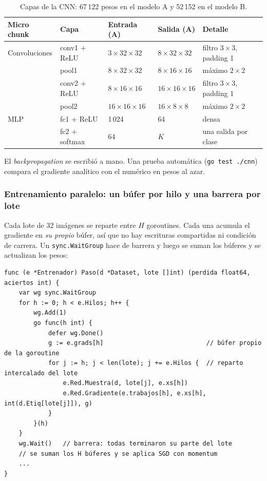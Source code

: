 \documentclass[10pt,a4paper]{article}
\begin{document}
\begin{table}[H]
\centering
\small
\begin{tabular}{lllll}
\toprule
\textbf{Micro chunk} & \textbf{Capa} & \textbf{Entrada (A)} & \textbf{Salida (A)} & \textbf{Detalle} \\
\midrule
Convoluciones & conv1 + ReLU & $3 \times 32 \times 32$ & $8 \times 32 \times 32$ & filtro $3 \times 3$, padding 1 \\
 & pool1 & $8 \times 32 \times 32$ & $8 \times 16 \times 16$ & máximo $2 \times 2$ \\
 & conv2 + ReLU & $8 \times 16 \times 16$ & $16 \times 16 \times 16$ & filtro $3 \times 3$, padding 1 \\
 & pool2 & $16 \times 16 \times 16$ & $16 \times 8 \times 8$ & máximo $2 \times 2$ \\
MLP & fc1 + ReLU & 1\,024 & 64 & densa \\
 & fc2 + softmax & 64 & $K$ & una salida por clase \\
\bottomrule
\end{tabular}
\caption{Capas de la CNN: 67\,122 pesos en el modelo A y 52\,152 en el modelo B.}
\label{tab:cnn}
\end{table}

El \textit{backpropagation} se escribió a mano. Una prueba automática (\texttt{go test ./cnn}) compara
el gradiente analítico con el numérico en pesos al azar.

\subsubsection{Entrenamiento paralelo: un búfer por hilo y una barrera por lote}

Cada lote de 32 imágenes se reparte entre $H$ goroutines. Cada una acumula el gradiente en \emph{su
propio} búfer, así que no hay escrituras compartidas ni condición de carrera. Un
\texttt{sync.WaitGroup} hace de barrera y luego se suman los búferes y se actualizan los pesos:

\begin{lstlisting}[language={}]
func (e *Entrenador) Paso(d *Dataset, lote []int) (perdida float64, aciertos int) {
    var wg sync.WaitGroup
    for h := 0; h < e.Hilos; h++ {
        wg.Add(1)
        go func(h int) {
            defer wg.Done()
            g := e.grads[h]                            // búfer propio de la goroutine
            for j := h; j < len(lote); j += e.Hilos {  // reparto intercalado del lote
                e.Red.Muestra(d, lote[j], e.xs[h])
                e.Red.Gradiente(e.trabajos[h], e.xs[h], int(d.Etiq[lote[j]]), g)
            }
        }(h)
    }
    wg.Wait()   // barrera: todas terminaron su parte del lote
    // se suman los H búferes y se aplica SGD con momentum
    ...
}
\end{lstlisting}
\end{document}

